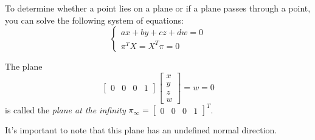 \documentclass[12pt, a4paper]{report}
\begin{document}
    To determine whether a point lies on a plane or if a plane passes through a point, you can solve the following system of equations:
    \[
    \begin{cases}
        ax+by+cz+dw=0 \\
        \pi^TX=X^T\pi=0
    \end{cases}
    \]
    \begin{definition}
        The plane 
        \[\begin{bmatrix} 0 & 0 & 0 & 1 \end{bmatrix} \begin{bmatrix} x \\ y \\ z \\ w \end{bmatrix}=w=0\] 
        is called the \emph{plane at the infinity} $\pi_{\infty}={\begin{bmatrix} 0 & 0 & 0 & 1 \end{bmatrix}}^T$. 
    \end{definition}
    It's important to note that this plane has an undefined normal direction.
\end{document}
